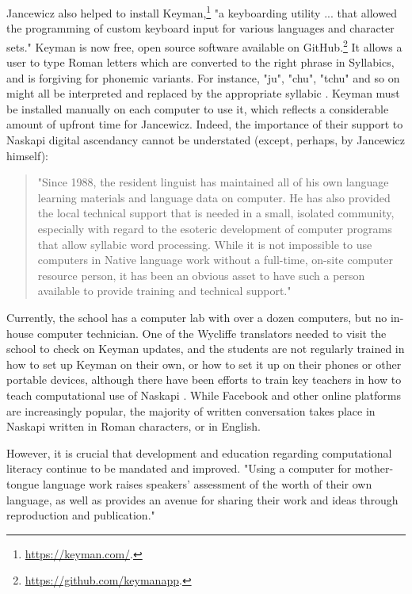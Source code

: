 Jancewicz also helped to install Keyman,\footnote{\href{https://keyman.com/}{https://keyman.com/}. } "a keyboarding utility ... that allowed the programming of custom keyboard input for various languages and character sets." \citep[85]{jancewicz2002applied} Keyman is now free, open source software available on GitHub.\footnote{\href{https://github.com/keymanapp}{https://github.com/keymanapp}. } It allows a user to type Roman letters which are converted to the right phrase in Syllabics, and is forgiving for phonemic variants. For instance, "ju", "chu", "tchu" and so on might all be interpreted and replaced by the appropriate syllabic . %
Keyman must be installed manually on each computer to use it, which reflects a considerable amount of upfront time for Jancewicz. Indeed, the importance of their support to Naskapi digital ascendancy cannot be understated (except, perhaps, by Jancewicz himself):

\begin{quote}
"Since 1988, the resident linguist has maintained all of his own language learning materials and language data on computer. He has also provided the local technical support that is needed in a small, isolated community, especially with regard to the esoteric development of computer programs that allow syllabic word processing. While it is not impossible to use computers in Native language work without a full-time, on-site computer resource person, it has been an obvious asset to have such a person available to provide training and technical support." \citep[86]{jancewicz2002applied}
\end{quote}

Currently, the school has a computer lab with over a dozen computers, but no in-house computer technician. One of the Wycliffe translators needed to visit the school to check on Keyman updates, and the students are not regularly trained in how to set up Keyman on their own, or how to set it up on their phones or other portable devices, although there have been efforts to train key teachers in how to teach computational use of Naskapi \citep{jancewicz1998developing}. While Facebook and other online platforms are increasingly popular, the majority of written conversation takes place in Naskapi written in Roman characters, or in English.

However, it is crucial that development and education regarding computational literacy continue to be mandated and improved. "Using a computer for mother-tongue language work raises speakers' assessment of the worth of their own language, as well as provides an avenue for sharing their work and ideas through reproduction and publication." \citet{jancewicz2002applied}

